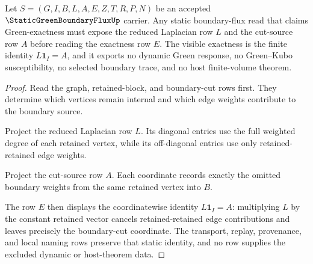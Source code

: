 \begin{theorem}
\label{thm:static-green-boundary-flux-exactness}
Let $S=(G,I,B,L,A,E,Z,T,R,P,N)$ be an accepted $\StaticGreenBoundaryFluxUp$ carrier. Any static boundary-flux read that claims Green-exactness must expose the reduced Laplacian row $L$ and the cut-source row $A$ before reading the exactness row $E$. The visible exactness is the finite identity $L\mathbf{1}_I=A$, and it exports no dynamic Green response, no Green--Kubo susceptibility, no selected boundary trace, and no host finite-volume theorem.
\end{theorem}
\begin{proof}
Read the graph, retained-block, and boundary-cut rows first. They determine which vertices remain internal and which edge weights contribute to the boundary source.

Project the reduced Laplacian row $L$. Its diagonal entries use the full weighted degree of each retained vertex, while its off-diagonal entries use only retained-retained edge weights.

Project the cut-source row $A$. Each coordinate records exactly the omitted boundary weights from the same retained vertex into $B$.

The row $E$ then displays the coordinatewise identity $L\mathbf{1}_I=A$: multiplying $L$ by the constant retained vector cancels retained-retained edge contributions and leaves precisely the boundary-cut coordinate. The transport, replay, provenance, and local naming rows preserve that static identity, and no row supplies the excluded dynamic or host-theorem data.
\end{proof}

